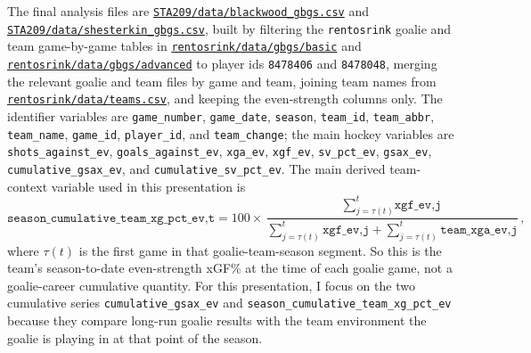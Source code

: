 \documentclass[
  10pt,
]{extarticle}
\begin{document}
The final analysis files are \href{https://github.com/RentoSaijo/STA209/blob/main/data/blackwood_gbgs.csv}{\texttt{STA209/data/blackwood\_gbgs.csv}} and \href{https://github.com/RentoSaijo/STA209/blob/main/data/shesterkin_gbgs.csv}{\texttt{STA209/data/shesterkin\_gbgs.csv}}, built by filtering the \texttt{rentosrink} goalie and team game-by-game tables in \href{https://github.com/RentoSaijo/rentosrink/tree/main/data/gbgs/basic}{\texttt{rentosrink/data/gbgs/basic}} and \href{https://github.com/RentoSaijo/rentosrink/tree/main/data/gbgs/advanced}{\texttt{rentosrink/data/gbgs/advanced}} to player ids \texttt{8478406} and \texttt{8478048}, merging the relevant goalie and team files by game and team, joining team names from \href{https://github.com/RentoSaijo/rentosrink/blob/main/data/teams.csv}{\texttt{rentosrink/data/teams.csv}}, and keeping the even-strength columns only. The identifier variables are \texttt{game\_number}, \texttt{game\_date}, \texttt{season}, \texttt{team\_id}, \texttt{team\_abbr}, \texttt{team\_name}, \texttt{game\_id}, \texttt{player\_id}, and \texttt{team\_change}; the main hockey variables are \texttt{shots\_against\_ev}, \texttt{goals\_against\_ev}, \texttt{xga\_ev}, \texttt{xgf\_ev}, \texttt{sv\_pct\_ev}, \texttt{gsax\_ev}, \texttt{cumulative\_gsax\_ev}, and \texttt{cumulative\_sv\_pct\_ev}. The main derived team-context variable used in this presentation is
\[
\texttt{season\_cumulative\_team\_xg\_pct\_ev,t} =
100 \times
\frac{\sum_{j=\tau(t)}^{t} \texttt{xgf\_ev,j}}
{\sum_{j=\tau(t)}^{t} \texttt{xgf\_ev,j} + \sum_{j=\tau(t)}^{t} \texttt{team\_xga\_ev,j}},
\]
where \(\tau(t)\) is the first game in that goalie-team-season segment. So this is the team's season-to-date even-strength xGF\% at the time of each goalie game, not a goalie-career cumulative quantity. For this presentation, I focus on the two cumulative series \texttt{cumulative\_gsax\_ev} and \texttt{season\_cumulative\_team\_xg\_pct\_ev} because they compare long-run goalie results with the team environment the goalie is playing in at that point of the season.
\end{document}
